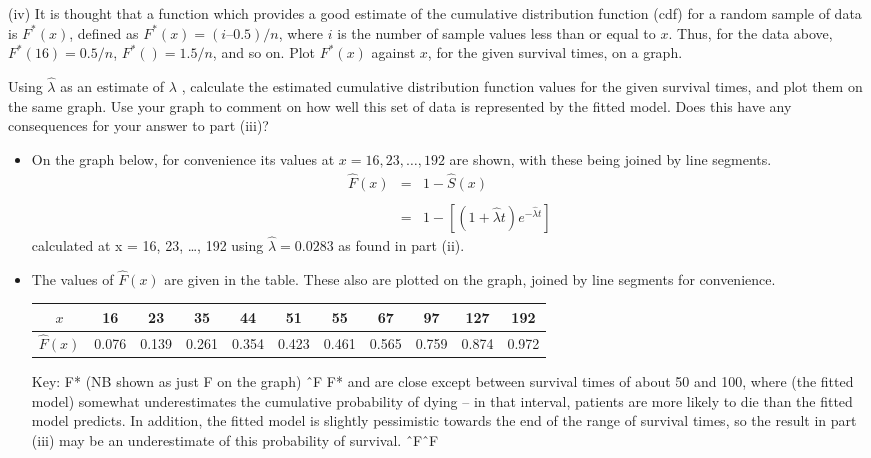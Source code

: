 \documentclass[a4paper,12pt]{article}
\begin{document}
\begin{framed}
\large
(iv) It is thought that a function which provides a good estimate of the cumulative distribution function (cdf) for a random sample of data is $F^{\ast}(x)$, defined as $F^{\ast}(x) = (i – 0.5)/n$, where $i$ is the number of sample values less than or equal to $x$. Thus, for the data above, $F^{\ast}(16) = 0.5/n$, $F^{\ast}() = 1.5/n$, and so on.
Plot $F^{\ast}(x)$ against $x$, for the given survival times, on a graph. 

Using $\hat{\lambda}$ as an estimate of $\lambda$ , calculate the estimated cumulative distribution function values
for the given survival times, and plot them on the same graph.
Use your graph to comment on how well this set of data is represented by the
fitted model. Does this have any consequences for your answer to part (iii)?
\end{framed}
\begin{itemize}
\item On the graph below, for convenience its values at $x = 16, 23, \ldots, 192$ are shown, with these being joined by line segments.
\begin{eqnarray*}
\hat{F}(x) &=& 1 - \hat{S}(x) \\
& & \\
&=& 1 - \left[( 1 + \hat{\lambda} t ) e^{ - \hat{\lambda} t} \right]
\end{eqnarray*}calculated at x = 16, 23, …, 192 using $\hat{\lambda} = 0.0283$ as found in part (ii). 

\item The values of $\hat{F}(x)$ are given in the table. These also are plotted on the graph, joined by line segments for convenience.

\begin{center}
\begin{tabular}{|c|c|c|c|c|c|c|c|c|c|c|} \hline
$x$ &16&23&35&44&51&55&67&97&127&192\\ \hline
$\hat{F}(x)$&0.076&0.139&0.261&0.354&0.423&0.461&0.565&0.759&0.874&0.972\\ \hline
\end{tabular}
\end{center}
Key:
F*
(NB shown as just F on the graph) ˆF
F* and are close except between survival times of about 50 and 100, where (the fitted model) somewhat underestimates the cumulative probability of dying – in that interval, patients are more likely to die than the fitted model predicts. In addition, the fitted model is slightly pessimistic towards the end of the range of survival times, so the result in part (iii) may be an underestimate of this probability of survival. ˆFˆF
 \end{itemize}
 
\end{document}
